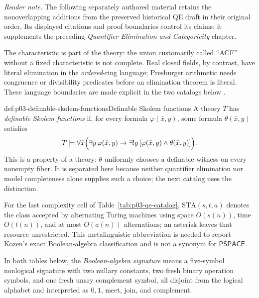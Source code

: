 \noindent\textit{Reader note.} The following separately authored material
retains the nonoverlapping additions from the preserved historical QE draft in
their original order.  Its displayed citations and proof boundaries control
its claims; it supplements the preceding
\emph{Quantifier Elimination and Categoricity} chapter.

The characteristic is part of the theory: the union customarily called
``ACF'' without a fixed characteristic is not complete.  Real closed fields,
by contrast, have literal elimination in the \emph{ordered}-ring language;
Presburger arithmetic needs congruence or divisibility predicates before an
elimination theorem is literal.  These language boundaries are made explicit
in the two catalogs below \cite{Marker2002,Presburger1929}.

\begin{hbdefinition}{def:p03-definable-skolem-functions}{Definable Skolem functions}
A theory \(T\) has \emph{definable Skolem functions} if, for every formula
\(\varphi(\bar x,y)\), some formula \(\theta(\bar x,y)\) satisfies
\[
 T\models\forall\bar x\Bigl(
   \exists y\,\varphi(\bar x,y)\to
   \exists!y\,[\varphi(\bar x,y)\land\theta(\bar x,y)]\Bigr).
\]
This is a property of a theory: \(\theta\) uniformly chooses a definable
witness on every nonempty fiber.  It is separated here because neither
quantifier elimination nor model completeness alone supplies such a choice;
the next catalog uses the distinction.
\end{hbdefinition}

For the last complexity cell of Table~\ref{tab:p03-qe-catalog},
\(\mathrm{STA}(s,t,a)\) denotes the class accepted by alternating Turing
machines using space \(O(s(n))\), time \(O(t(n))\), and at most \(O(a(n))\)
alternations; an asterisk leaves that resource unrestricted.  This
metalinguistic abbreviation is needed to report Kozen's exact Boolean-algebra
classification and is not a synonym for \(\mathsf{PSPACE}\).

In both tables below, the \emph{Boolean-algebra signature} means a five-symbol
nonlogical signature with two nullary constants, two fresh binary operation
symbols, and one fresh unary complement symbol, all disjoint from the logical
alphabet and interpreted as \(0,1\), meet, join, and complement.

